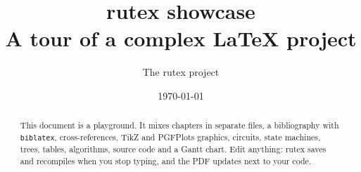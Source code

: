 \documentclass[11pt,a4paper,oneside]{report}
\title{%
  {\Huge\bfseries rutex showcase}\\[1ex]
  {\Large A tour of a complex \LaTeX{} project}%
}
\author{The rutex project}
\date{\today}
\begin{document}
\maketitle

\begin{abstract}
  This document is a playground. It mixes chapters in separate files, a
  bibliography with \texttt{biblatex}, cross-references, TikZ and PGFPlots
  graphics, circuits, state machines, trees, tables, algorithms, source code and a
  Gantt chart. Edit anything: rutex saves and recompiles when you stop typing,
  and the PDF updates next to your code.
\end{abstract}

\tableofcontents
\listoffigures
\listoftables








\appendix


\printbibliography[heading=bibintoc]
\end{document}
